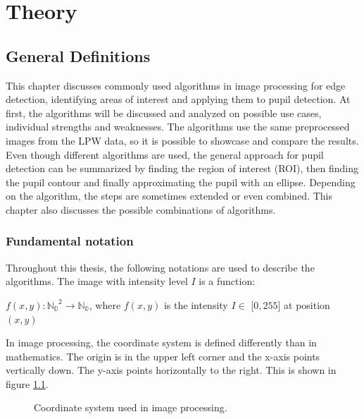 \chapter{Theory}
\section{General Definitions}
This chapter discusses commonly used algorithms in image processing for edge detection, identifying areas of interest and applying them to pupil detection. At first, the algorithms will be discussed and analyzed on possible use cases, individual strengths and weaknesses. The algorithms use the same preprocessed images from the LPW data, so it is possible to showcase and compare the results. Even though different algorithms are used, the general approach for pupil detection can be summarized by finding the region of interest (ROI), then finding the pupil contour and finally approximating the pupil with an ellipse. Depending on the algorithm, the steps are sometimes extended or even combined. This chapter also discusses the possible combinations of algorithms. 

\subsection{Fundamental notation}\label{subsec:funda}
Throughout this thesis, the following notations are used to describe the algorithms.
The image with intensity level $I$ is a function:

$f(x,y): \mathbb{\mathbb{N_0} }^2 \rightarrow \mathbb{\mathbb{N_0}}$, where $f(x,y)$ is the intensity $I \in $ [$0,255$] at position $(x,y)$

In image processing, the coordinate system is defined differently than in mathematics. The origin is in the upper left corner and the x-axis points vertically down. The y-axis points horizontally to the right. This is shown in figure \ref{fig:coordsystem}.

\begin{figure}[h]
    \centering


    \caption{Coordinate system used in image processing.}
    \label{fig:coordsystem}
\end{figure}

